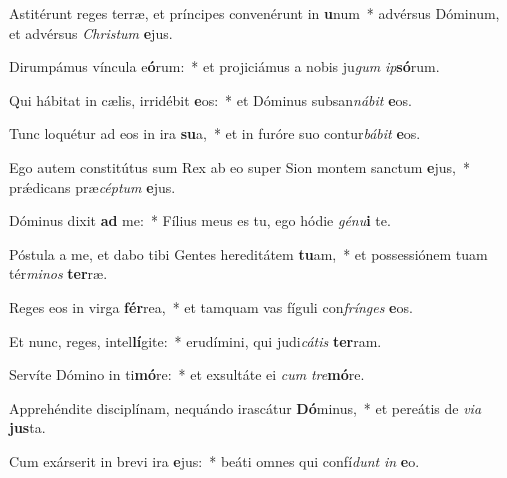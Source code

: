 \item Astitérunt reges terræ, et príncipes convenérunt in \textbf{u}num~* advérsus Dóminum, et advérsus \textit{Chris}\textit{tum} \textbf{e}jus.
\item Dirumpámus víncula e\textbf{ó}rum:~* et projiciámus a nobis ju\textit{gum} \textit{ip}\textbf{só}rum.
\item Qui hábitat in cælis, irridébit \textbf{e}os:~* et Dóminus subsan\textit{ná}\textit{bit} \textbf{e}os.
\item Tunc loquétur ad eos in ira \textbf{su}a,~* et in furóre suo contur\textit{bá}\textit{bit} \textbf{e}os.
\item Ego autem constitútus sum Rex ab eo super Sion montem sanctum \textbf{e}jus,~* prǽdicans præ\textit{cép}\textit{tum} \textbf{e}jus.
\item Dóminus dixit \textbf{ad} me:~* Fílius meus es tu, ego hódie \textit{gé}\textit{nu}\textbf{i} te.
\item Póstula a me, et dabo tibi Gentes hereditátem \textbf{tu}am,~* et possessiónem tuam tér\textit{mi}\textit{nos} \textbf{ter}ræ.
\item Reges eos in virga \textbf{fér}rea,~* et tamquam vas fíguli con\textit{frín}\textit{ges} \textbf{e}os.
\item Et nunc, reges, intel\textbf{lí}gite:~* erudímini, qui judi\textit{cá}\textit{tis} \textbf{ter}ram.
\item Servíte Dómino in ti\textbf{mó}re:~* et exsultáte ei \textit{cum} \textit{tre}\textbf{mó}re.
\item Apprehéndite disciplínam, nequándo irascátur \textbf{Dó}minus,~* et pereátis de \textit{vi}\textit{a} \textbf{jus}ta.
\item Cum exárserit in brevi ira \textbf{e}jus:~* beáti omnes qui confí\textit{dunt} \textit{in} \textbf{e}o.
